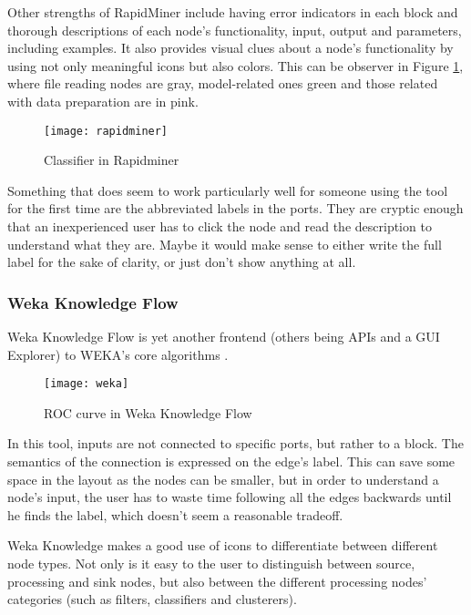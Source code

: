 Other strengths of RapidMiner include having error indicators in each block
and thorough descriptions of each
node's functionality, input, output and parameters, including examples. It also
provides visual clues about a node's functionality by using not only meaningful
icons but also colors. This can be observer in Figure \ref{fig:rapidminer},
where file reading nodes are gray, model-related ones green and those related
with data preparation are in pink.

\begin{figure}[t]
  \begin{center}
    \leavevmode
    \texttt{[image: rapidminer]}
    \caption{Classifier in Rapidminer \cite{rapidminer}}
    \label{fig:rapidminer}
  \end{center}
\end{figure}

Something that does seem to work particularly well for someone using the tool
for the first time are the abbreviated labels in the ports. They are cryptic
enough that an inexperienced user has to click the node and read the description
to understand what they are. Maybe it would make sense to either write the full
label for the sake of clarity, or just don't show anything at all.

\subsubsection{Weka Knowledge Flow}

Weka Knowledge Flow is yet another frontend (others being APIs and a GUI Explorer)
to WEKA's core algorithms \cite{weka}.

\begin{figure}[t]
  \begin{center}
    \leavevmode
    \texttt{[image: weka]}
    \caption{ROC curve in Weka Knowledge Flow \cite{weka}}
    \label{fig:weka}
  \end{center}
\end{figure}

In this tool, inputs are not connected to specific ports, but rather to a block.
The semantics of the connection is expressed on the edge's label. This can save
some space in the layout as the nodes can be smaller, but in order to understand
a node's input, the user has to waste time following all the edges backwards
until he finds the label, which doesn't seem a reasonable tradeoff.

Weka Knowledge makes a good use of icons to differentiate between different node
types. Not only is it easy to the user to distinguish between source, processing
and sink nodes, but also between the different processing nodes' categories
(such as filters, classifiers and clusterers).


